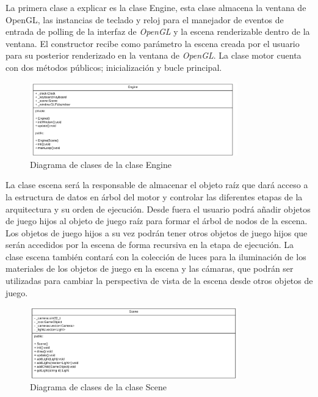 \documentclass[a4paper]{book}
\begin{document}
La primera clase a explicar es la clase Engine, esta clase almacena la ventana de OpenGL, las instancias de teclado y reloj
para el manejador de eventos de entrada de polling de la interfaz de \textit{OpenGL} y la escena renderizable dentro de la ventana.
El constructor recibe como parámetro la escena creada por el usuario para su posterior renderizado en la ventana de \textit{OpenGL}.
La clase motor cuenta con dos métodos públicos; inicialización y bucle principal.

\begin{figure}[H]
    \centering
    \includegraphics[width=9cm, keepaspectratio]{img/Engine.png}
    \caption{Diagrama de clases de la clase Engine}
    \label{Engine}
\end{figure}

La clase escena será la responsable de almacenar el objeto raíz que dará acceso a la estructura de datos en árbol del motor y
controlar las diferentes etapas de la arquitectura y su orden de ejecución. Desde fuera el usuario podrá añadir objetos de
juego hijos al objeto de juego raíz para formar el árbol de nodos de la escena. Los objetos de juego hijos a su vez podrán
tener otros objetos de juego hijos que serán accedidos por la escena de forma recursiva en la etapa de ejecución. La clase escena también
contará con la colección de luces para la iluminación de los materiales de los objetos de juego en la escena y las cámaras, que podrán
ser utilizadas para cambiar la perspectiva de vista de la escena desde otros objetos de juego.

\begin{figure}[H]
    \centering
    \includegraphics[width=9cm, keepaspectratio]{img/Scene.png}
    \caption{Diagrama de clases de la clase Scene}
    \label{Scene}
\end{figure}
\end{document}
